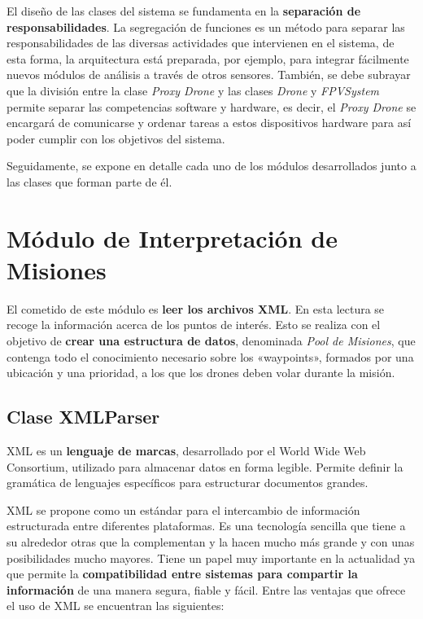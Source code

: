 El diseño de las clases del sistema se fundamenta en la \textbf{separación de responsabilidades}. La segregación de funciones es un método para separar las responsabilidades de las diversas actividades que intervienen en el sistema, de esta forma, la arquitectura está preparada, por ejemplo, para integrar fácilmente nuevos módulos de análisis a través de otros sensores. También, se debe subrayar que la división entre la clase \textit{Proxy Drone} y las clases \textit{Drone} y \textit{FPVSystem} permite separar las competencias software y hardware, es decir, el \textit{Proxy Drone} se encargará de comunicarse y ordenar tareas a estos dispositivos hardware para así poder cumplir con los objetivos del sistema.

Seguidamente, se expone en detalle cada uno de los módulos desarrollados junto a las clases que forman parte de él.

\section{Módulo de Interpretación de Misiones}

El cometido de este módulo es \textbf{leer los archivos XML}. En esta lectura se recoge la información acerca de los puntos de interés. Esto se realiza con el objetivo de \textbf{crear una estructura de datos}, denominada \textit{Pool de Misiones}, que contenga todo el conocimiento necesario sobre los «waypoints», formados por una ubicación y una prioridad, a los que los drones deben volar durante la misión.


\subsection{Clase XMLParser}

XML es un \textbf{lenguaje de marcas}, desarrollado por el World Wide Web Consortium, utilizado para almacenar datos en forma legible. Permite definir la gramática de lenguajes específicos para estructurar documentos grandes. 

XML se propone como un estándar para el intercambio de información estructurada entre diferentes plataformas. Es una tecnología sencilla que tiene a su alrededor otras que la complementan y la hacen mucho más grande y con unas posibilidades mucho mayores. Tiene un papel muy importante en la actualidad ya que permite la \textbf{compatibilidad entre sistemas para compartir la información} de una manera segura, fiable y fácil. Entre las ventajas que ofrece el uso de XML se encuentran las siguientes:

